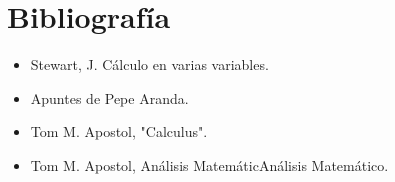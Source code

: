 \documentclass{../Calculo.tex}
\begin{document}
\section{Bibliografía}
\begin{itemize}
	\item Stewart, J. Cálculo en varias variables.
	\item Apuntes de Pepe Aranda.
	\item Tom M. Apostol, "Calculus".
	\item Tom M. Apostol, Análisis MatemáticAnálisis Matemático.
\end{itemize}
\end{document}

